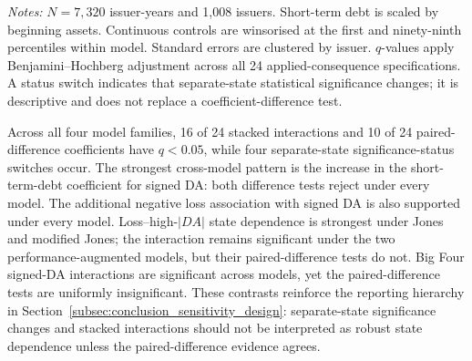 \begin{table}[htbp]
\centering
\caption{Applied-consequence sensitivity under modified Jones}
\label{tab:research_conclusion_sensitivity}
\scriptsize
{}
\begin{minipage}{0.97\textwidth}\footnotesize
\textit{Notes:} $N=7{,}320$ issuer-years and 1,008 issuers. Short-term debt is scaled by beginning assets. Continuous controls are winsorised at the first and ninety-ninth percentiles within model. Standard errors are clustered by issuer. $q$-values apply Benjamini--Hochberg adjustment across all 24 applied-consequence specifications. A status switch indicates that separate-state statistical significance changes; it is descriptive and does not replace a coefficient-difference test.
\end{minipage}
\end{table}

Across all four model families, 16 of 24 stacked interactions and 10 of 24 paired-difference coefficients have $q<0.05$, while four separate-state significance-status switches occur. The strongest cross-model pattern is the increase in the short-term-debt coefficient for signed DA: both difference tests reject under every model. The additional negative loss association with signed DA is also supported under every model. Loss--high-$|DA|$ state dependence is strongest under Jones and modified Jones; the interaction remains significant under the two performance-augmented models, but their paired-difference tests do not. Big Four signed-DA interactions are significant across models, yet the paired-difference tests are uniformly insignificant. These contrasts reinforce the reporting hierarchy in Section~\ref{subsec:conclusion_sensitivity_design}: separate-state significance changes and stacked interactions should not be interpreted as robust state dependence unless the paired-difference evidence agrees.


